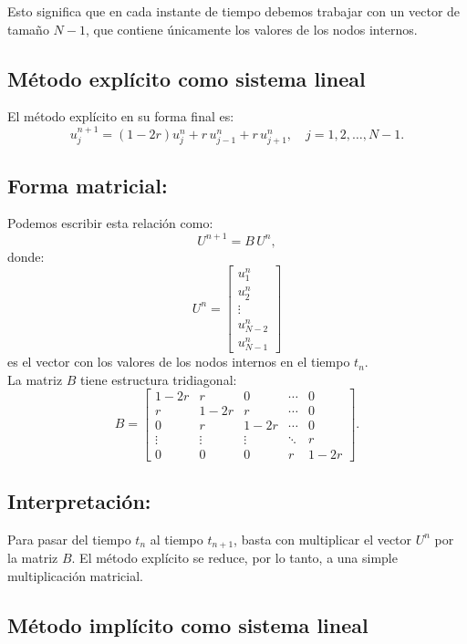 \documentclass[12pt,a4paper]{article}
\begin{document}
Esto significa que en cada instante de tiempo debemos trabajar con un vector de tamaño \(N-1\), que contiene únicamente los valores de los nodos internos.

\subsection{Método explícito como sistema lineal}

El método explícito en su forma final es:
\[
u_j^{n+1} = (1-2r)u_j^n + r\,u_{j-1}^n + r\,u_{j+1}^n, 
\quad j = 1, 2, \dots, N-1.
\]

\subsection*{Forma matricial:}
Podemos escribir esta relación como:
\[
U^{n+1} = B\,U^n,
\]
donde:
\[
U^n = 
\begin{bmatrix}
u_1^n \\[4pt] u_2^n \\[4pt] \vdots \\[4pt] u_{N-2}^n \\[4pt] u_{N-1}^n
\end{bmatrix}
\]
es el vector con los valores de los nodos internos en el tiempo \(t_n\). \\

La matriz \(B\) tiene estructura tridiagonal:
\[
B = 
\begin{bmatrix}
1-2r & r     & 0     & \cdots & 0 \\[4pt]
r     & 1-2r & r     & \cdots & 0 \\[4pt]
0     & r     & 1-2r & \cdots & 0 \\[4pt]
\vdots& \vdots& \vdots& \ddots & r \\[4pt]
0     & 0     & 0     & r      & 1-2r
\end{bmatrix}.
\]

\subsection*{Interpretación:}
Para pasar del tiempo \(t_n\) al tiempo \(t_{n+1}\), basta con multiplicar el vector \(U^n\) por la matriz \(B\).  
El método explícito se reduce, por lo tanto, a una simple multiplicación matricial.

\subsection{Método implícito como sistema lineal}
\end{document}
